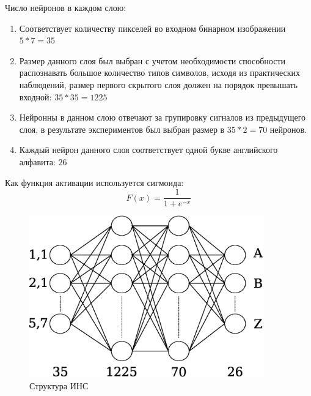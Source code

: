 \documentclass[russian,utf8,emptystyle]{eskdtext}
\begin{document}
Число нейронов в каждом слою:
\renewcommand{\theenumi}{\arabic{enumi}}
\begin{enumerate}
\item Соответствует количеству пикселей во входном бинарном изображении $5*7 = 35$
\item Размер данного слоя был выбран с учетом необходимости способности распознавать большое количество типов символов, исходя из практических наблюдений, размер первого скрытого слоя должен на порядок превышать входной: $35*35 = 1225$
\item Нейронны в данном слою отвечают за групировку сигналов из предыдущего слоя, в результате экспериментов был выбран размер в $35*2 = 70$ нейронов.
\item Каждый нейрон данного слоя соответствует одной букве английского алфавита: $26$
\end{enumerate}

Как функция активации используется сигмоида:
$$
F(x) = \frac{1}{1+e^{-x}}
$$

\begin{figure}[h!]
\includegraphics[width=0.9\textwidth]{neural-netowk-structure}
\caption{Структура ИНС}
\end{figure}
\clearpage
\end{document}
